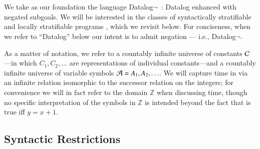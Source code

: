 \section{\large \bf \slang}
\label{sec:slang}

We take as our foundation the language Datalog$\lnot$~\cite{ullmanbook}: Datalog enhanced with negated subgoals.  We will be interested in the
classes of syntactically stratifiable 
and locally stratifiable programs , which we revisit below.  For conciseness, when we refer to ``Datalog'' below our intent is to admit negation --- i.e., Datalog$\lnot$.  


As a matter of notation, we refer to a countably infinite universe of constants
$\Consts$---in which $C_{1}, C_{2}, \ldots$ are representations of individual
constants---and a countably infinite universe of variable symbols $\Vars = A_1,
A_2, \ldots$.
We will capture time in \slang via an infinite relation  isomorphic to the successor relation on the integers; for convenience we will in fact refer to the domain $\mathbb{Z}$ when discussing time, though no specific interpretation of the symbols in $\mathbb{Z}$ is intended beyond the fact that  is true iff $y = x + 1$.


\subsection{Syntactic Restrictions}
\label{sec:syntaxrestrictions}


